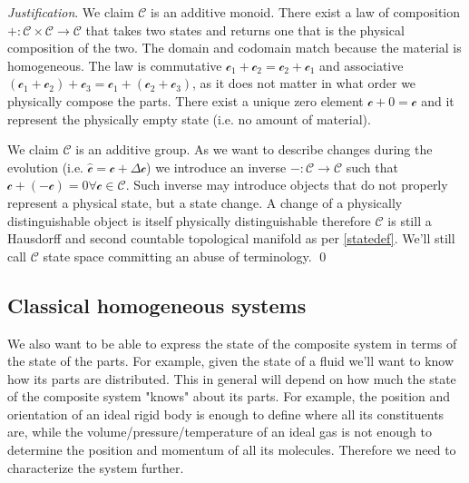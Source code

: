 \documentclass[aps,pra,10pt,twocolumn,floatfix,nofootinbib]{revtex4-1}
\theoremstyle{definition}
\newenvironment{justification}{\emph{Justification}.}{\qed}
\begin{document}
\begin{justification}
We claim $\mathcal{C}$ is an additive monoid. There exist a law of composition $+ : \mathcal{C} \times \mathcal{C} \rightarrow \mathcal{C}$ that takes two states and returns one that is the physical composition of the two. The domain and codomain match because the material is homogeneous. The law is commutative $\mathcal{c}_1 +\mathcal{c}_2 = \mathcal{c}_2+\mathcal{c}_1$ and associative $(\mathcal{c}_1 + \mathcal{c}_2) + \mathcal{c}_3 = \mathcal{c}_1 + (\mathcal{c}_2 + \mathcal{c}_3)$, as it does not matter in what order we physically compose the parts. There exist a unique zero element $\mathcal{c} + 0 = \mathcal{c}$ and it represent the physically empty state (i.e. no amount of material).

We claim $\mathcal{C}$ is an additive group. As we want to describe changes during the evolution (i.e. $\hat{\mathcal{c}} = \mathcal{c} +\Delta \mathcal{c}$) we introduce an inverse $- : \mathcal{C} \rightarrow \mathcal{C}$ such that $\mathcal{c} + ( - \mathcal{c}) = 0 \forall \mathcal{c} \in \mathcal{C}$. Such inverse may introduce objects that do not properly represent a physical state, but a state change. A change of a physically distinguishable object is itself physically distinguishable therefore $\mathcal{C}$ is still a Hausdorff and second countable topological manifold as per \ref{statedef}. We'll still call $\mathcal{C}$ state space committing an abuse of terminology.
\end{justification}

\subsection{Classical homogeneous systems}
We also want to be able to express the state of the composite system in terms of the state of the parts. For example, given the state of a fluid we'll want to know how its parts are distributed. This in general will depend on how much the state of the composite system "knows" about its parts. For example, the position and orientation of an ideal rigid body is enough to define where all its constituents are, while the volume/pressure/temperature of an ideal gas is not enough to determine the position and momentum of all its molecules. Therefore we need to characterize the system further.
\end{document}
